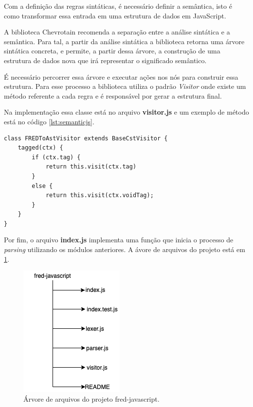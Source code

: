 Com a definição das regras sintáticas, é necessário definir a semântica, isto é 
como transformar essa entrada em uma estrutura de dados em JavaScript. 

A biblioteca Chevrotain recomenda a separação entre a análise sintática e a semântica. Para tal,
a partir da análise sintática a biblioteca retorna uma árvore sintática concreta, e permite, a partir 
dessa árvore, a construção de uma estrutura de dados nova que irá representar o significado semântico.

É necessário percorrer essa árvore e executar ações nos nós para construir essa estrutura.
Para esse processo a biblioteca utiliza o padrão \textit{Visitor} onde existe um método referente
a cada regra e é responsável por gerar a estrutura final.

Na implementação essa classe está no arquivo \textbf{visitor.js} e um exemplo de método 
está no código \ref{lst:semanticjs}.

\begin{lstlisting}[caption=Exemplo de ação semântica,label={lst:semanticjs}]
class FREDToAstVisitor extends BaseCstVisitor {
    tagged(ctx) {
        if (ctx.tag) {
            return this.visit(ctx.tag)
        }
        else {
            return this.visit(ctx.voidTag);
        }
    }
}
\end{lstlisting}

Por fim, o arquivo \textbf{index.js} implementa uma função que inicia o processo de 
\textit{parsing} utilizando os módulos anteriores. A ávore de arquivos do projeto está
em \ref{fig:filetreejs}.

\begin{figure}[h]
	\centering
	\includegraphics[keepaspectratio=true,scale=0.7]{figuras/jstree.png}
	\caption{Árvore de arquivos do projeto fred-javascript.}
	\label{fig:filetreejs}
\end{figure}


